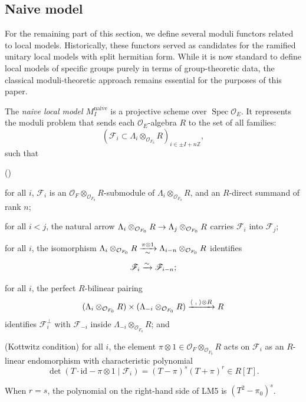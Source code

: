 \documentclass[pdflatex,sn-mathphys-num]{sn-jnl}%
\makeatletter
\theoremstyle{thmstyleone}%
\theoremstyle{thmstyletwo}%
\numberwithin{equation}{subsection}
\theoremstyle{thmstylethree}%
\newcommand{\sF}{\ensuremath{\mathscr{F}}\xspace}
\newcommand{\CO}{\ensuremath{\mathcal{O}}\xspace}
\newcommand{\id}{\ensuremath{\mathrm{id}}\xspace}
\newcommand{\naive}{\ensuremath{\mathrm{naive}}\xspace}
\DeclareMathOperator{\Spec}{Spec}
\newcommand{\aform}{\ensuremath{\langle\text{~,~}\rangle}\xspace}
\newenvironment{altenumerate}
	{\begin{list}
			{(\theenumi) }
			{\usecounter{enumi}
				\setlength{\labelwidth}{0pt}
				\setlength{\labelsep}{0pt}
				\setlength{\leftmargin}{0pt}
				\setlength{\itemsep}{\the\smallskipamount}
				\renewcommand{\theenumi}{\roman{enumi}}
		}}
		{\end{list}}
\renewcommand{\to}{%
		\ifbool{@display}{\longrightarrow}{\rightarrow}%
	}
\newlength{\olen}
\newlength{\ulen}
\newlength{\xlen}
\newcommand{\xra}[2][]{%
		\ifbool{@display}%
		{\settowidth{\olen}{$\overset{#2}{\longrightarrow}$}%
			\settowidth{\ulen}{$\underset{#1}{\longrightarrow}$}%
			\settowidth{\xlen}{$\xrightarrow[#1]{#2}$}%
			\ifdimgreater{\olen}{\xlen}%
			{\underset{#1}{\overset{#2}{\longrightarrow}}}%
			{\ifdimgreater{\ulen}{\xlen}%
				{\underset{#1}{\overset{#2}{\longrightarrow}}}
				{\xrightarrow[#1]{#2}}}}%
		{\xrightarrow[#1]{#2}}
	}
\newcommand{\isoarrow}{%
		\ifbool{@display}{\overset{\sim}{\longrightarrow}}{\xrightarrow\sim}%
	}
\newcommand{\undertilde}{\raisebox{0.4ex}{\smash[t]{$\scriptstyle\sim$}}}
\makeatother
\begin{document}
\subsection{Naive model}\label{moduli_naive}
For the remaining part of this section, we define several moduli functors related to local models. Historically, these functors served as candidates for the ramified unitary local models with split hermitian form. 
While it is now standard to define local models of specific groups purely in terms of group-theoretic data, the classical moduli-theoretic approach remains essential for the purposes of this paper.
		
The \emph{naive local model $M_I^\naive$} is a projective scheme over $\Spec \CO_E$. It represents the moduli problem that sends each $\CO_E$-algebra $R$ to the set of all families:
\begin{equation*}
    (\sF_i \subset \Lambda_i \otimes_{\CO_{F_0}}R)_{i\in \pm I + n\mathbb{Z}},
\end{equation*}
such that
\begin{altenumerate}		
	\item[\fontfamily{cmtt}\selectfont LM1.]\label{moduli_naive:LM1}
		for all $i$, $\sF_i$ is an $\CO_F \otimes_{\CO_{F_0}} R$-submodule of $\Lambda_i \otimes_{\CO_{F_0}} R$, and an $R$-direct summand of rank $n$;
	\item[\fontfamily{cmtt}\selectfont LM2.]\label{moduli_naive:LM2}
		for all $i < j$, the natural arrow $\Lambda_i \otimes_{\CO_{F_0}} R \to \Lambda_j \otimes_{\CO_{F_0}} R$ carries $\sF_i$ into $\sF_j$;
	\item[\fontfamily{cmtt}\selectfont LM3.]\label{moduli_naive:LM3}
		for all $i$, the isomorphism $\Lambda_i \otimes_{\CO_{F_0}} R \xra[\undertilde]{\pi \otimes 1} \Lambda_{i-n} \otimes_{\CO_{F_0}} R$ identifies
		\begin{equation*}
		    \sF_i \isoarrow \sF_{i-n};
		\end{equation*}
	\item[\fontfamily{cmtt}\selectfont LM4.]\label{moduli_naive:LM4}
		for all $i$, the perfect $R$-bilinear pairing
        \begin{equation*}
            (\Lambda_i \otimes_{\CO_{F_0}} R) \times (\Lambda_{-i} \otimes_{\CO_{F_0}} R)
			\xra{\aform \otimes R} R
        \end{equation*}
		identifies $\sF_i^\perp$ with $\sF_{-i}$ inside $\Lambda_{-i} \otimes_{\CO_{F_0}} R$; and
	\item[\fontfamily{cmtt}\selectfont LM5.]\label{moduli_naive:kott}
        (Kottwitz condition) for all $i$, the element $\pi \otimes 1 \in \CO_F\otimes_{\CO_{F_0}} R$ acts on $\sF_i$ as an $R$-linear endomorphism with characteristic polynomial
		\begin{equation*}
		    \det(T\cdot \id - \pi \otimes 1 \mid \sF_i) = (T-\pi)^s(T+\pi)^r \in R[T].
		\end{equation*}
		\end{altenumerate}
		When $r = s$, the polynomial on the right-hand side of {\selectfont LM5} is $(T^2 - \pi_0)^s$.
\end{document}
